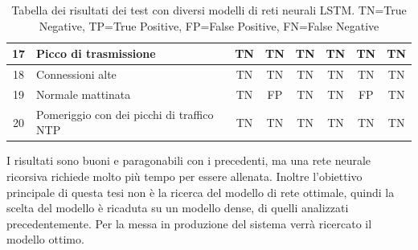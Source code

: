\begin{table}
\begin{tabularx}{\textwidth}{||c X c c c c c c||}
        \hline
        17 & Picco di trasmissione & TN & TN & TN & TN & TN & TN\\        
        \hline
        18 & Connessioni alte & TN & TN & TN & TN & TN & TN\\
        \hline
        19 & Normale mattinata & TN & FP & TN & TN & FP & TN\\ 
        \hline
        20 & Pomeriggio con dei picchi di traffico NTP & TN & TN & TN & TN & TN & TN\\ 
        \hline
    \end{tabularx}
    \caption{Tabella dei risultati dei test con diversi modelli di reti neurali LSTM. TN=True Negative, TP=True Positive, FP=False Positive, FN=False Negative}
    \label{table:LSTM_tests}
\end{table}

I risultati sono buoni e paragonabili con i precedenti, ma una rete neurale ricorsiva richiede molto più tempo per essere allenata. Inoltre l'obiettivo principale di questa tesi non è la ricerca del modello di rete ottimale, quindi la scelta del modello è ricaduta su un modello dense, di quelli analizzati precedentemente. Per la messa in produzione del sistema verrà ricercato il modello ottimo.